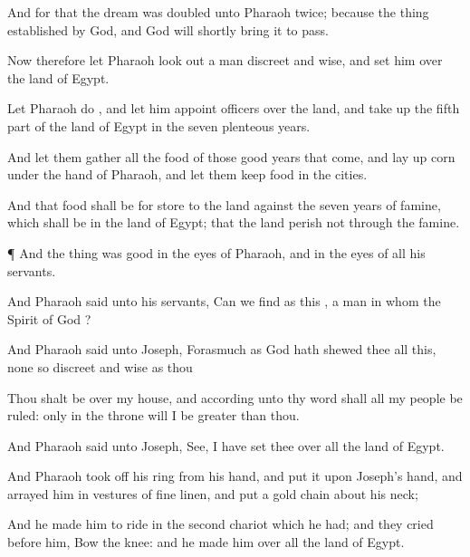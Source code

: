 {And for that the
dream was
doubled unto
Pharaoh
twice;
{} because the
thing
{}
established
by
God, and
God will
shortly bring it to
pass.


\par }{\PP {}Now therefore let
Pharaoh look
out a
man
discreet and
wise, and
set him over the
land of
Egypt.

Let
Pharaoh
do
{}, and let him
appoint
officers over the
land, and take up the fifth
part of the
land of
Egypt in the
seven
plenteous
years.

And let them
gather all the
food of those
good
years that
come, and lay
up
corn under the
hand of
Pharaoh, and let them
keep
food in the
cities.

And that
food shall be for
store to the
land against the
seven
years of
famine, which shall be in the
land of
Egypt; that the
land
perish not through the
famine.


\par }{\PP {}¶ And the
thing was
good in the
eyes of
Pharaoh, and in the
eyes of all his
servants.

And
Pharaoh
said unto his
servants, Can we
find
{} as
this
{}, a
man in
whom the
Spirit of
God
{}?

And
Pharaoh
said unto
Joseph,
Forasmuch as
God hath
shewed thee all this,
{} none so
discreet and
wise as thou
{}

Thou shalt
be over my
house, and according unto thy
word shall all my
people be
ruled: only in the
throne will I be
greater than thou.

And
Pharaoh
said unto
Joseph,
See, I have
set thee over all the
land of
Egypt.

And
Pharaoh took
off his
ring from his
hand, and
put it upon
Joseph’s
hand, and
arrayed him in
vestures of fine
linen, and
put a
gold
chain about his
neck;

And he made him to
ride in the
second
chariot which he had; and they
cried before
him, Bow the
knee: and he
made him
{} over all the
land of
Egypt.

}

